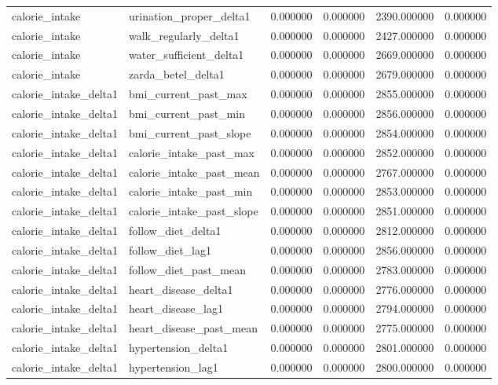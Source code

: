 \begin{longtable}{llrrrr}
calorie\_intake & urination\_proper\_delta1 & 0.000000 & 0.000000 & 2390.000000 & 0.000000 \\
calorie\_intake & walk\_regularly\_delta1 & 0.000000 & 0.000000 & 2427.000000 & 0.000000 \\
calorie\_intake & water\_sufficient\_delta1 & 0.000000 & 0.000000 & 2669.000000 & 0.000000 \\
calorie\_intake & zarda\_betel\_delta1 & 0.000000 & 0.000000 & 2679.000000 & 0.000000 \\
calorie\_intake\_delta1 & bmi\_current\_past\_max & 0.000000 & 0.000000 & 2855.000000 & 0.000000 \\
calorie\_intake\_delta1 & bmi\_current\_past\_min & 0.000000 & 0.000000 & 2856.000000 & 0.000000 \\
calorie\_intake\_delta1 & bmi\_current\_past\_slope & 0.000000 & 0.000000 & 2854.000000 & 0.000000 \\
calorie\_intake\_delta1 & calorie\_intake\_past\_max & 0.000000 & 0.000000 & 2852.000000 & 0.000000 \\
calorie\_intake\_delta1 & calorie\_intake\_past\_mean & 0.000000 & 0.000000 & 2767.000000 & 0.000000 \\
calorie\_intake\_delta1 & calorie\_intake\_past\_min & 0.000000 & 0.000000 & 2853.000000 & 0.000000 \\
calorie\_intake\_delta1 & calorie\_intake\_past\_slope & 0.000000 & 0.000000 & 2851.000000 & 0.000000 \\
calorie\_intake\_delta1 & follow\_diet\_delta1 & 0.000000 & 0.000000 & 2812.000000 & 0.000000 \\
calorie\_intake\_delta1 & follow\_diet\_lag1 & 0.000000 & 0.000000 & 2856.000000 & 0.000000 \\
calorie\_intake\_delta1 & follow\_diet\_past\_mean & 0.000000 & 0.000000 & 2783.000000 & 0.000000 \\
calorie\_intake\_delta1 & heart\_disease\_delta1 & 0.000000 & 0.000000 & 2776.000000 & 0.000000 \\
calorie\_intake\_delta1 & heart\_disease\_lag1 & 0.000000 & 0.000000 & 2794.000000 & 0.000000 \\
calorie\_intake\_delta1 & heart\_disease\_past\_mean & 0.000000 & 0.000000 & 2775.000000 & 0.000000 \\
calorie\_intake\_delta1 & hypertension\_delta1 & 0.000000 & 0.000000 & 2801.000000 & 0.000000 \\
calorie\_intake\_delta1 & hypertension\_lag1 & 0.000000 & 0.000000 & 2800.000000 & 0.000000 \\

\end{longtable}
